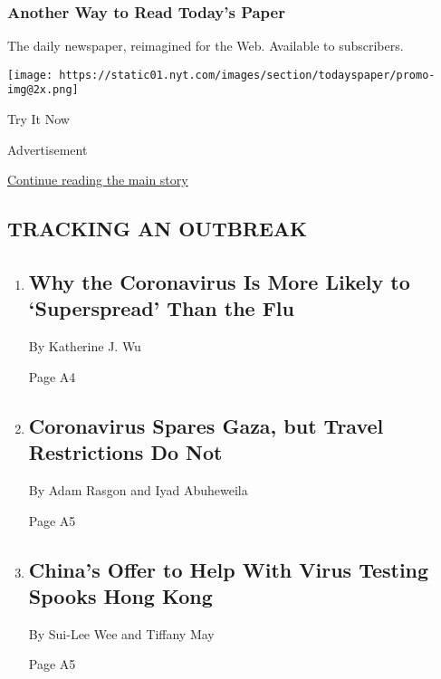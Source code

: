 \href{http://app.nytimes.com/todayspaper}{}

\hypertarget{another-way-to-read-todays-paper}{%
\subsubsection{Another Way to Read Today's
Paper}\label{another-way-to-read-todays-paper}}

The daily newspaper, reimagined for the Web. Available to subscribers.

\texttt{[image: https://static01.nyt.com/images/section/todayspaper/promo-img@2x.png]}

Try It Now

Advertisement

\protect\hyperlink{after-mid1}{Continue reading the main story}

\hypertarget{tracking-an-outbreak}{%
\subsection{TRACKING AN OUTBREAK}\label{tracking-an-outbreak}}

\begin{enumerate}
\def\labelenumi{\arabic{enumi}.}
\item
  \href{/2020/08/07/health/coronavirus-superspreading-contagion.html}{}

  \hypertarget{why-the-coronavirus-is-more-likely-to-superspread-than-the-flu}{%
  \subsection{Why the Coronavirus Is More Likely to `Superspread' Than
  the
  Flu}\label{why-the-coronavirus-is-more-likely-to-superspread-than-the-flu}}

  By Katherine J. Wu

  Page A4
\item
  \href{/2020/08/08/world/middleeast/coronavirus-gaza.html}{}

  \hypertarget{coronavirus-spares-gaza-but-travel-restrictions-do-not-1}{%
  \subsection{Coronavirus Spares Gaza, but Travel Restrictions Do
  Not}\label{coronavirus-spares-gaza-but-travel-restrictions-do-not-1}}

  By Adam Rasgon and Iyad Abuheweila

  Page A5
\item
  \href{/2020/08/06/business/hong-kong-china-coronavirus-testing.html}{}

  \hypertarget{chinas-offer-to-help-with-virus-testing-spooks-hong-kong}{%
  \subsection{China's Offer to Help With Virus Testing Spooks Hong
  Kong}\label{chinas-offer-to-help-with-virus-testing-spooks-hong-kong}}

  By Sui-Lee Wee and Tiffany May

  Page A5
\end{enumerate}

